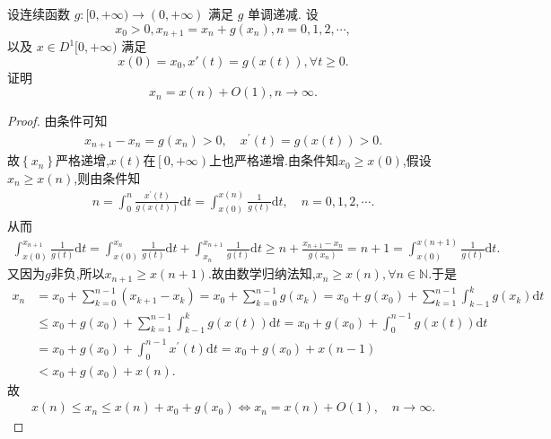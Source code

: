\documentclass[../../main.tex]{subfiles}%
\begin{document}
\begin{example}
设连续函数 $g:[0,+\infty)\to(0,+\infty)$ 满足 $g$ 单调递减. 设
\[
x_0>0, x_{n+1}=x_n+g(x_n), n=0,1,2,\cdots,
\]
以及 $x\in D^1[0,+\infty)$ 满足
\[
x(0)=x_0 ,x'(t)=g(x(t)), \forall t\geqslant0.
\]
证明
\[
x_n=x(n)+O(1), n\to\infty.
\]
\end{example}
\begin{proof}
由条件可知
\begin{align*}
x_{n+1}-x_n=g\left( x_n \right) >0,\quad x^\prime \left( t \right) =g\left( x\left( t \right) \right) >0.
\end{align*}
故$\left\{ x_n \right\}$严格递增,$x\left( t \right)$在$\left[ 0,+\infty \right)$上也严格递增.由条件知$x_0\geqslant x\left( 0 \right)$,假设$x_n\geqslant x\left( n \right)$,则由条件知
\begin{align*}
n=\int_0^n{\frac{x^\prime \left( t \right)}{g\left( x(t) \right)}\mathrm{d}t}=\int_{x\left( 0 \right)}^{x\left( n \right)}{\frac{1}{g\left( t \right)}\mathrm{d}t},\quad n=0,1,2,\cdots .
\end{align*}
从而
\begin{align*}
\int_{x\left( 0 \right)}^{x_{n+1}}{\frac{1}{g\left( t \right)}\mathrm{d}t}=\int_{x\left( 0 \right)}^{x_n}{\frac{1}{g\left( t \right)}\mathrm{d}t}+\int_{x_n}^{x_{n+1}}{\frac{1}{g\left( t \right)}\mathrm{d}t}\geqslant n+\frac{x_{n+1}-x_n}{g\left( x_n \right)}=n+1=\int_{x\left( 0 \right)}^{x\left( n+1 \right)}{\frac{1}{g\left( t \right)}\mathrm{d}t}.
\end{align*}
又因为$g$非负,所以$x_{n+1}\geqslant x\left( n+1 \right)$.故由数学归纳法知,$x_n\geqslant x\left( n \right),\forall n\in \mathbb{N}$.于是
\begin{align*}
x_n&=x_0+\sum\limits_{k=0}^{n-1}{\left( x_{k+1}-x_k \right)}=x_0+\sum\limits_{k=0}^{n-1}{g\left( x_k \right)}=x_0+g\left( x_0 \right) +\sum\limits_{k=1}^{n-1}{\int_{k-1}^k{g\left( x_k \right) \mathrm{d}t}}
\\
&\leqslant x_0+g\left( x_0 \right) +\sum\limits_{k=1}^{n-1}{\int_{k-1}^k{g\left( x\left( t \right) \right) \mathrm{d}t}}=x_0+g\left( x_0 \right) +\int_0^{n-1}{g\left( x\left( t \right) \right) \mathrm{d}t}
\\
&=x_0+g\left( x_0 \right) +\int_0^{n-1}{x^\prime \left( t \right) \mathrm{d}t}=x_0+g\left( x_0 \right) +x\left( n-1 \right) 
\\
&<x_0+g\left( x_0 \right) +x\left( n \right) .
\end{align*}
故
\begin{align*}
x\left( n \right) \leqslant x_n\leqslant x\left( n \right) +x_0+g\left( x_0 \right) \Longleftrightarrow x_n=x\left( n \right) +O\left( 1 \right) ,\quad n\rightarrow \infty .
\end{align*}
\end{proof}
\end{document}
